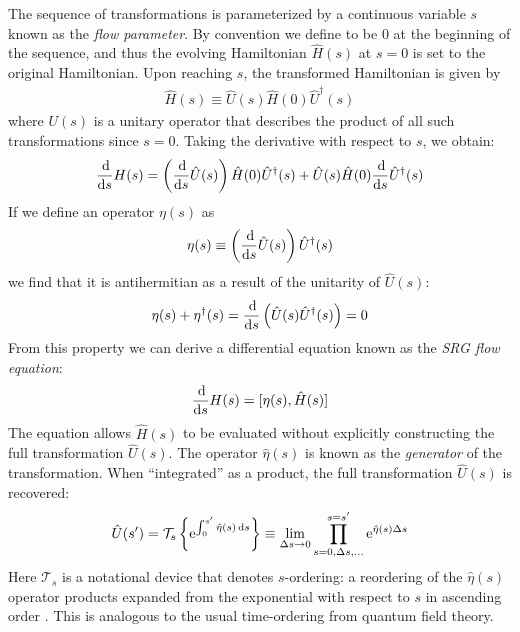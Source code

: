The sequence of transformations is parameterized by a continuous variable $s$
known as the \textit{flow parameter}.  By convention we define to be $0$ at
the beginning of the sequence, and thus the evolving Hamiltonian $\hat H(s)$
at $s = 0$ is set to the original Hamiltonian.  Upon reaching $s$, the
transformed Hamiltonian is given by
\begin{align*}
  \hat H(s) \equiv \hat U(s) \hat H(0) \hat U^\dagger(s)
\end{align*}
where $U(s)$ is a unitary operator that describes the product of all such
transformations since $s = 0$.  Taking the derivative with respect to $s$, we obtain:
\begin{align*}
  \frac{\operatorname{d\!}}{\operatorname{d\!} s} H(s) =
  \left(\frac{\operatorname{d\!}}{\operatorname{d\!} s} \hat{U}(s)\right) \hat{H}(0) \hat{U}^\dagger(s) +
  \hat{U}(s) \hat{H}(0) \frac{\operatorname{d\!}}{\operatorname{d\!} s} \hat{U}^\dagger(s)
\end{align*}
If we define an operator $\eta(s)$ as
\begin{align*}
  \eta(s) \equiv \left(\frac{\operatorname{d\!}}{\operatorname{d\!} s} \hat{U}(s)\right) \hat{U}^\dagger(s)
\end{align*}
we find that it is antihermitian as a result of the unitarity of $\hat{U}(s)$:
\begin{align*}
  \eta(s) + \eta^\dagger(s)
  = \frac{\operatorname{d\!}}{\operatorname{d\!} s} \left(\hat{U}(s) \hat{U}^\dagger(s)\right)
  = 0
\end{align*}
From this property we can derive a differential equation known as the
\textit{SRG flow equation}:
\begin{align} \label{eq:imsrgode}
  \frac{\operatorname{d\!}}{\operatorname{d\!} s} H(s) = [\eta(s), \hat{H}(s)]
\end{align}
The equation allows $\hat{H}(s)$ to be evaluated without explicitly
constructing the full transformation $\hat U(s)$.  The operator $\hat \eta(s)$
is known as the \textit{generator} of the transformation.  When ``integrated''
as a product, the full transformation $\hat U(s)$ is recovered:
\begin{align*}
  \hat U(s')
  = \mathcal T_s \left\{ \mathrm{e}^{\int_0^{s'} \hat{\eta}(s) \operatorname{d\!} s} \right\}
  \equiv \lim_{\Delta s \to 0} \prod_{s = 0, \Delta s, \ldots}^{s = s'}
  \mathrm{e}^{\hat \eta(s) \Delta s}
\end{align*}
Here $\mathcal T_s$ is a notational device that denotes $s$-ordering: a reordering of the $\hat{\eta}(s)$ operator products expanded from the exponential with respect to $s$ in ascending order \cite[\S 6.1]{reimann2013quantum}.  This is analogous to the usual time-ordering from quantum field theory.

